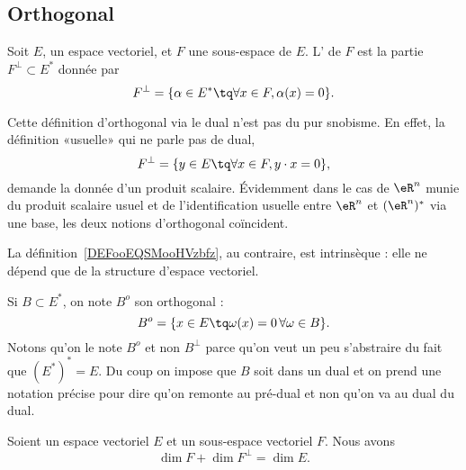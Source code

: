 \subsection{Orthogonal}

\begin{definition}      \label{DEFooEQSMooHVzbfz}
    Soit \( E\), un espace vectoriel, et \( F\) une sous-espace de \( E\). L' de \( F\) est la partie \( F^{\perp}\subset E^*\) donnée par
    \begin{equation}    \label{Eqiiyple}
        F^{\perp}=\{ \alpha\in E^*\tq \forall x\in F,\alpha(x)=0 \}.
    \end{equation}
\end{definition}

Cette définition d'orthogonal via le dual n'est pas du pur snobisme. En effet, la définition «usuelle» qui ne parle pas de dual,
\begin{equation}
    F^{\perp}=\{ y\in E\tq \forall x\in F,y\cdot x=0 \},
\end{equation}
demande la donnée d'un produit scalaire. Évidemment dans le cas de \( \eR^n\) munie du produit scalaire usuel et de l'identification usuelle entre \( \eR^n\) et \( (\eR^n)^*\) via une base, les deux notions d'orthogonal coïncident.

La définition~\ref{DEFooEQSMooHVzbfz}, au contraire, est intrinsèque : elle ne dépend que de la structure d'espace vectoriel.

Si \( B\subset E^*\), on note \( B^o\) son orthogonal :
\begin{equation}
    B^o=\{ x\in E\tq \omega(x)=0\,\forall \omega\in B \}.
\end{equation}
Notons qu'on le note \( B^o\) et non \( B^{\perp}\) parce qu'on veut un peu s'abstraire du fait que \( (E^*)^*=E\). Du coup on impose que \( B\) soit dans un dual et on prend une notation précise pour dire qu'on remonte au pré-dual et non qu'on va au dual du dual.

\begin{proposition} \label{PropXrTDIi}
    Soient un espace vectoriel \( E\) et un sous-espace vectoriel \( F\). Nous avons
    \begin{equation}
        \dim F+\dim F^{\perp}=\dim E.
    \end{equation}
\end{proposition}

